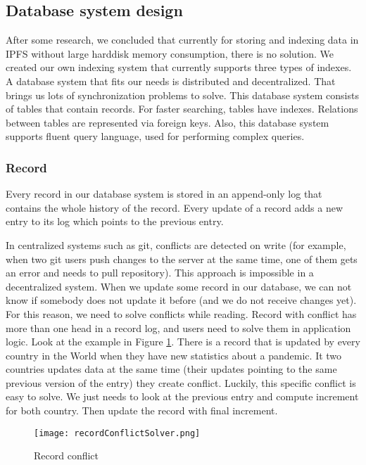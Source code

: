 \subsection{Database system design}
After some research, we concluded that currently for storing and indexing data in IPFS without large harddisk memory consumption, there is no solution. We created our own indexing system that currently supports three types of indexes. A database system that fits our needs is distributed and decentralized. That brings us lots of synchronization problems to solve. This database system consists of tables that contain records. For faster searching, tables have indexes. Relations between tables are represented via foreign keys. Also, this database system supports fluent query language, used for performing complex queries.

\subsubsection{Record} 
Every record in our database system is stored in an append-only log that contains the whole history of the record. Every update of a record adds a new entry to its log which points to the previous entry. 

In centralized systems such as git, conflicts are detected on write (for example, when two git users push changes to the server at the same time, one of them gets an error and needs to pull repository). This approach is impossible in a decentralized system. When we update some record in our database, we can not know if somebody does not update it before (and we do not receive changes yet). For this reason, we need to solve conflicts while reading. Record with conflict has more than one head in a record log, and users need to solve them in application logic. Look at the example in Figure \ref{recordConflict}. There is a record that is updated by every country in the World when they have new statistics about a pandemic. It two countries updates data at the same time (their updates pointing to the same previous version of the entry) they create conflict. Luckily, this specific conflict is easy to solve. We just needs to look at the previous entry and compute increment for both country. Then update the record with final increment.


\begin{figure}[h]
    \centering
    \texttt{[image: recordConflictSolver.png]}
    \caption{Record conflict}
    \label{recordConflict}
\end{figure}


